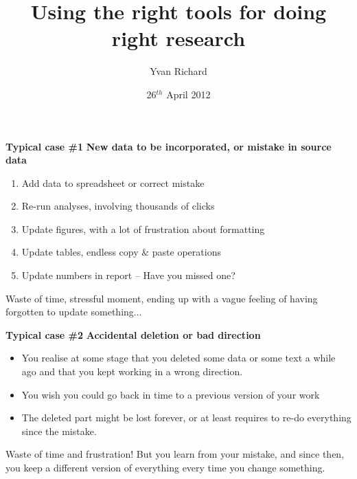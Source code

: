 \documentclass[9pt,xcolor=pdftex,dvipsnames,table]{beamer}
\title[Doing right research]{\textbf{Using the right tools for doing right research}}
\author{Yvan Richard}
\institute[Dragonfly Science]
{
Dragonfly Science \\
Level 5, 158 Victoria St, Wellington \\
\medskip
{\emph{yvan@dragonfly.co.nz}}
}
\date[Vic]{26$^{th}$ April 2012}
\newcommand\BackgroundPicture[2]{%
    \setbeamertemplate{background}{%
    \parbox[c][\paperheight]{\paperwidth}{%
 \texttt{[image: \#1]}
         \hfill \vfill
      }}}
\begin{document}
\BackgroundPicture{images/banner.png}{1.0}

\begin{frame}
\titlepage
\end{frame}


\begin{frame}{\textbf{Typical case \#1}}
\textbf{New data to be incorporated, or mistake in source data}
\begin{enumerate}
\item Add data to spreadsheet or correct mistake
\item Re-run analyses, involving thousands of clicks
\item Update figures, with a lot of frustration about formatting
\item Update tables, endless copy \& paste operations
\item Update numbers in report -- Have you missed one?
\end{enumerate}
\vspace{0.6cm}
Waste of time, stressful moment, ending up with a vague feeling of
having forgotten to update something...
\vspace{-0.5cm}
\end{frame}

\begin{frame}{\textbf{Typical case \#2}}
\textbf{Accidental deletion or bad direction}
\begin{itemize}
\item You realise at some stage that you deleted some data or some
  text a while ago and that you kept working in a wrong direction.
\item You wish you could go back in time to a previous version of your
  work
\item The deleted part might be lost forever, or at least requires to
  re-do everything since the mistake.
\end{itemize}
\vspace{0.6cm}
Waste of time and frustration! But you learn from your mistake, and
since then, you keep a different version of everything every time you
change something.
\vspace{-0.5cm}
\end{frame}
\end{document}
